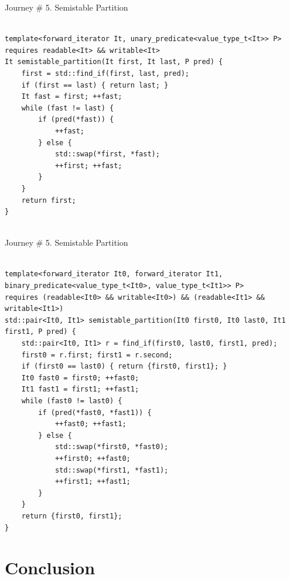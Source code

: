 \documentclass[10pt]{beamer}
\begin{document}
\begin{frame}[fragile]{Journey \# 5. Semistable Partition}
\begin{lstlisting}[style=cpp] %%%%%%%

template<forward_iterator It, unary_predicate<value_type_t<It>> P>
requires readable<It> && writable<It>
It semistable_partition(It first, It last, P pred) {
    first = std::find_if(first, last, pred);
    if (first == last) { return last; }
    It fast = first; ++fast;
    while (fast != last) {
        if (pred(*fast)) {
            ++fast;
        } else {
            std::swap(*first, *fast);
            ++first; ++fast;
        }
    }
    return first;
}


\end{lstlisting}
\end{frame}

\begin{frame}[fragile]{Journey \# 5. Semistable Partition}
\begin{lstlisting}[style=cpp] %%%%%%%

template<forward_iterator It0, forward_iterator It1, binary_predicate<value_type_t<It0>, value_type_t<It1>> P>
requires (readable<It0> && writable<It0>) && (readable<It1> && writable<It1>)
std::pair<It0, It1> semistable_partition(It0 first0, It0 last0, It1 first1, P pred) {
    std::pair<It0, It1> r = find_if(first0, last0, first1, pred);
    first0 = r.first; first1 = r.second;
    if (first0 == last0) { return {first0, first1}; }
    It0 fast0 = first0; ++fast0;
    It1 fast1 = first1; ++fast1;
    while (fast0 != last0) {
        if (pred(*fast0, *fast1)) {
            ++fast0; ++fast1;
        } else {
            std::swap(*first0, *fast0);
            ++first0; ++fast0;
            std::swap(*first1, *fast1);
            ++first1; ++fast1;
        }
    }
    return {first0, first1};
}

\end{lstlisting}
\end{frame}

\section{Conclusion}
\end{document}
